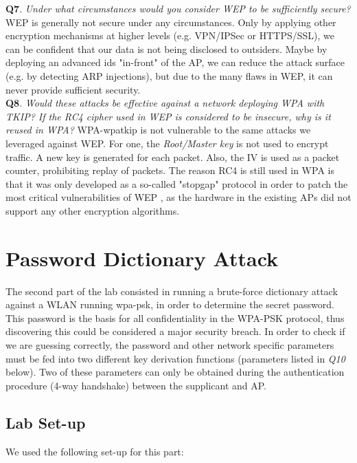 \documentclass[a4paper,11pt]{article}
\begin{document}
\noindent\textbf{Q7}. \textit{Under what circumstances would you consider WEP to be sufficiently secure?} WEP is generally not secure under any circumstances. Only by applying other encryption mechanisms at higher levels (e.g. VPN/IPSec or HTTPS/SSL), we can be confident that our data is not being disclosed to outsiders. Maybe by deploying an advanced \gls{ids} "in-front" of the AP, we can reduce the attack surface (e.g. by detecting ARP injections), but due to the many flaws in WEP, it can never provide sufficient security. \\

\noindent\textbf{Q8}. \textit{Would these attacks be effective against a network deploying WPA with TKIP? If the RC4 cipher used in WEP is considered to be insecure, why is it reused in WPA?} WPA-\gls{wpatkip} is not vulnerable to the same attacks we leveraged against WEP. For one, the \textit{Root/Master key} is not used to encrypt traffic. A new key is generated for each packet. Also, the IV is used as a packet counter, prohibiting replay of packets. The reason RC4 is still used in WPA is that it was only developed as a so-called "stopgap" protocol in order to patch the most critical vulnerabilities of WEP \cite{wepwiki}, as the hardware in the existing APs did not support any other encryption algorithms. 

\section{Password Dictionary Attack} 

The second part of the lab consisted in running a brute-force dictionary attack against a WLAN running \gls{wpa}-\gls{psk}, in order to determine the secret password. This password is the basis for all confidentiality in the WPA-PSK protocol, thus discovering this could be considered a major security breach. In order to check if we are guessing correctly, the password and other network specific parameters must be fed into two different key derivation functions (parameters listed in \textit{Q10} below). Two of these parameters can only be obtained during the authentication procedure (4-way handshake) between the supplicant and AP.

\subsection{Lab Set-up}

We used the following set-up for this part:
\end{document}
